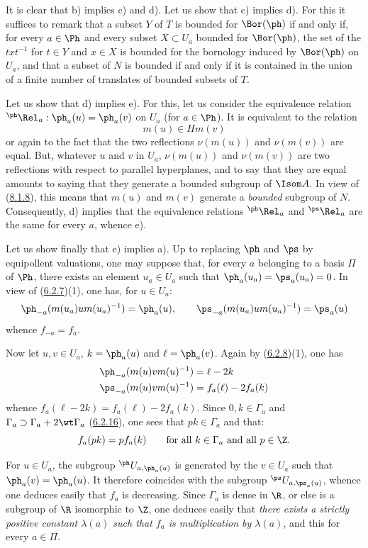 \documentclass[12pt,a4paper,oneside,english]{smfart}
\makeatletter
\newcommand{\btpageanchor}[1]{\Hy@raisedlink{\hypertarget{p:#1}{}}}
\newcommand{\btref}[1]{\hyperlink{bt:#1}{#1}}
\newcommand{\btpage}[1]{\marginnote{p.~#1}\btpageanchor{#1}}
\newcommand{\pg}[1]{\btpage{#1}}
\theoremstyle{definition}
\theoremstyle{bt}
\makeatother
\begin{document}
It is clear that b) implies c) and d). Let us show that c) implies d). For this it
suffices to remark that a subset $Y$ of $T$ is bounded for $\Bor(\ph)$ if and only if,
for every $a\in\Ph$ and every subset $X\subset U_a$ bounded for $\Bor(\ph)$, the set of
the $txt^{-1}$ for $t\in Y$ and $x\in X$ is bounded for the bornology induced by
$\Bor(\ph)$ on $U_a$, and that a subset of $N$ is bounded if and only if it is contained
in the union of a finite number of translates of bounded subsets of $T$.

Let us show that d) implies e). For this, let us consider the equivalence relation
${}^{\ph}\Rel_a:\ph_a(u)=\ph_a(v)$ on $U_a$ (for $a\in\Ph$). It is equivalent to the
relation
\[
m(u)\in Hm(v)
\]
\pg{192}
or again to the fact that the two reflections $\nu(m(u))$ and $\nu(m(v))$ are equal.
But, whatever $u$ and $v$ in $U_a$, $\nu(m(u))$ and $\nu(m(v))$ are two reflections with
respect to parallel hyperplanes, and to say that they are equal amounts to saying that
they generate a bounded subgroup of $\Isom A$. In view of (\btref{8.1.8}), this means that
$m(u)$ and $m(v)$ generate a \emph{bounded} subgroup of $N$. Consequently, d) implies
that the equivalence relations ${}^{\ph}\Rel_a$ and ${}^{\ps}\Rel_a$ are the same for
every $a$, whence e).

Let us show finally that e) implies a). Up to replacing $\ph$ and $\ps$ by equipollent
valuations, one may suppose that, for every $a$ belonging to a basis $\Pi$ of $\Ph$,
there exists an element $u_a\in U_a$ such that $\ph_a(u_a)=\ps_a(u_a)=0$. In view of
(\btref{6.2.7})(1), one has, for $u\in U_a$:
\[
\ph_{-a}(m(u_a)um(u_a)^{-1})=\ph_a(u),\qquad
\ps_{-a}(m(u_a)um(u_a)^{-1})=\ps_a(u)
\]
whence $f_{-a}=f_a$.

Now let $u,v\in U_a$, $k=\ph_a(u)$ and $\ell=\ph_a(v)$. Again by (\btref{6.2.8})(1), one has
\begin{align*}
\ph_{-a}(m(u)vm(u)^{-1})&=\ell-2k\\
\ps_{-a}(m(u)vm(u)^{-1})&=f_a(\ell)-2f_a(k)
\end{align*}
whence $f_a(\ell-2k)=f_a(\ell)-2f_a(k)$. Since $0,k\in\Gamma_a$ and
$\Gamma_a\supset\Gamma_a+2\wt\Gamma_a$ (\btref{6.2.16}), one sees that $pk\in\Gamma_a$ and that:
\[
f_a(pk)=pf_a(k)\qquad\text{for all }k\in\Gamma_a\text{ and all }p\in\Z .
\]

For $u\in U_a$, the subgroup ${}^{\ph}U_{a,\ph_a(u)}$ is generated by the $v\in U_a$
such that $\ph_a(v)=\ph_a(u)$. It therefore coincides with the subgroup
${}^{\ps}U_{a,\ps_a(u)}$, whence one deduces easily that $f_a$ is decreasing. Since
$\Gamma_a$ is dense in $\R$, or else is a subgroup of $\R$ isomorphic to $\Z$, one
deduces easily that \emph{there exists a strictly positive constant $\lambda(a)$ such
that $f_a$ is multiplication by $\lambda(a)$}, and this for every $a\in\Pi$.
\end{document}
